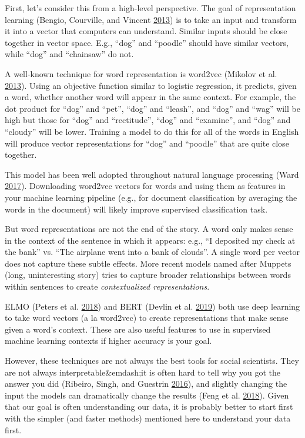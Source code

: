 \documentclass[]{krantz}
\begin{document}
First, let's consider this from a high-level perspective. The goal of
representation learning (Bengio, Courville, and Vincent
\protect\hyperlink{ref-bengio-13}{2013}) is to take an input and
transform it into a vector that computers can understand. Similar inputs
should be close together in vector space. E.g., ``dog'' and ``poodle''
should have similar vectors, while ``dog'' and ``chainsaw'' do not.

A well-known technique for word representation is word2vec (Mikolov et
al. \protect\hyperlink{ref-mikolov-13}{2013}). Using an objective
function similar to logistic regression, it predicts, given a word,
whether another word will appear in the same context. For example, the
dot product for ``dog'' and ``pet'', ``dog'' and ``leash'', and ``dog''
and ``wag'' will be high but those for ``dog'' and ``rectitude'',
``dog'' and ``examine'', and ``dog'' and ``cloudy'' will be lower.
Training a model to do this for all of the words in English will produce
vector representations for ``dog'' and ``poodle'' that are quite close
together.

This model has been well adopted throughout natural language processing
(Ward \protect\hyperlink{ref-church-17}{2017}). Downloading word2vec
vectors for words and using them as features in your machine learning
pipeline (e.g., for document classification by averaging the words in
the document) will likely improve supervised classification task.

But word representations are not the end of the story. A word only makes
sense in the context of the sentence in which it appears: e.g., ``I
deposited my check at the bank'' vs. ``The airplane went into a bank of
clouds''. A single word per vector does not capture these subtle
effects. More recent models named after Muppets (long, uninteresting
story) tries to capture broader relationships between words within
sentences to create \emph{contextualized representations}.

ELMO (Peters et al. \protect\hyperlink{ref-peters-18}{2018}) and BERT
(Devlin et al. \protect\hyperlink{ref-devlin-18}{2019}) both use deep
learning to take word vectors (a la word2vec) to create representations
that make sense given a word's context. These are also useful features
to use in supervised machine learning contexts if higher accuracy is
your goal.

However, these techniques are not always the best tools for social
scientists. They are not always interpretable\&emdash;it is often hard
to tell why you got the answer you did (Ribeiro, Singh, and Guestrin
\protect\hyperlink{ref-ribeiro-16}{2016}), and slightly changing the
input the models can dramatically change the results (Feng et al.
\protect\hyperlink{ref-feng-18}{2018}). Given that our goal is often
understanding our data, it is probably better to start first with the
simpler (and faster methods) mentioned here to understand your data
first.
\end{document}
